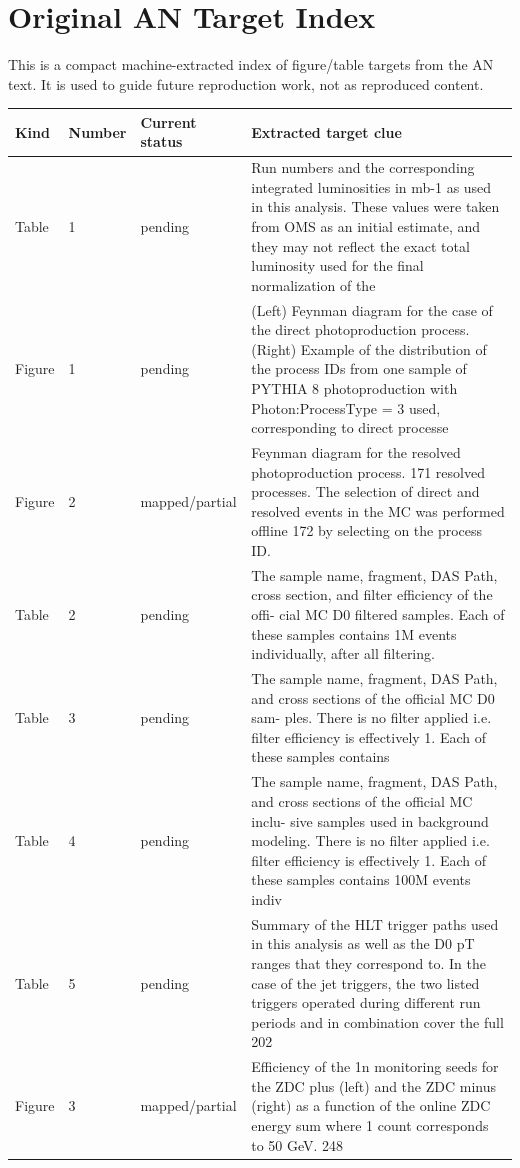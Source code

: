 \documentclass[11pt]{article}
\begin{document}
\section*{Original AN Target Index}
This is a compact machine-extracted index of figure/table targets from the AN text. It is used to guide future reproduction work, not as reproduced content.
\begin{longtable}{lll p{}}
\toprule
Kind & Number & Current status & Extracted target clue \\
\midrule
\endhead
Table & 1 & pending & Run numbers and the corresponding integrated luminosities in mb-1 as used in this analysis. These values were taken from OMS as an initial estimate, and they may not reflect the exact total luminosity used for the final normalization of the \\
Figure & 1 & pending & (Left) Feynman diagram for the case of the direct photoproduction process. (Right) Example of the distribution of the process IDs from one sample of PYTHIA 8 photoproduction with Photon:ProcessType = 3 used, corresponding to direct processe \\
Figure & 2 & mapped/partial & Feynman diagram for the resolved photoproduction process. 171 resolved processes. The selection of direct and resolved events in the MC was performed offline 172 by selecting on the process ID. \\
Table & 2 & pending & The sample name, fragment, DAS Path, cross section, and filter efficiency of the offi- cial MC D0 filtered samples. Each of these samples contains 1M events individually, after all filtering. \\
Table & 3 & pending & The sample name, fragment, DAS Path, and cross sections of the official MC D0 sam- ples. There is no filter applied i.e. filter efficiency is effectively 1. Each of these samples contains \\
Table & 4 & pending & The sample name, fragment, DAS Path, and cross sections of the official MC inclu- sive samples used in background modeling. There is no filter applied i.e. filter efficiency is effectively 1. Each of these samples contains 100M events indiv \\
Table & 5 & pending & Summary of the HLT trigger paths used in this analysis as well as the D0 pT ranges that they correspond to. In the case of the jet triggers, the two listed triggers operated during different run periods and in combination cover the full 202 \\
Figure & 3 & mapped/partial & Efficiency of the 1n monitoring seeds for the ZDC plus (left) and the ZDC minus (right) as a function of the online ZDC energy sum where 1 count corresponds to 50 GeV. 248 \\

\end{longtable}
\end{document}
